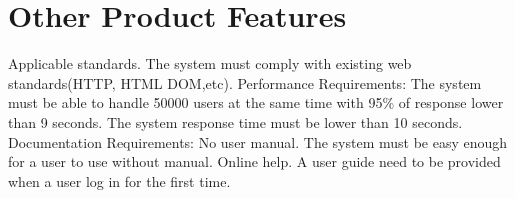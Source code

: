 \documentclass[a4paper]{article}
\begin{document}
\section{Other Product Features}
Applicable standards. The system must comply with existing web standards(HTTP, HTML DOM,etc).
Performance Requirements:
The system must be able to handle 50000 users at the same time with 95\% of response lower than 9 seconds. 
The system response time must be lower than 10 seconds.
Documentation Requirements: 
No user manual. The system must be easy enough for a user to use without manual.
Online help. A user guide need to be provided when a user log in for the first time.
\end{document}
